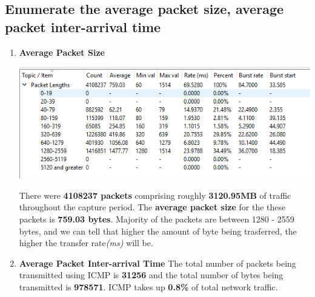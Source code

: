 \documentclass[a4paper,11pt]{article}
\begin{document}
\subsection{Enumerate the average packet size, average packet inter-arrival time }
\begin{enumerate}
	\item \textbf{Average Packet Size}
	\newline\newline
	\begin{minipage}{5in}
	\centering
		\includegraphics[width = 16cm]{avgpacketsize}
		\captionsetup{justification=centering}
	\end{minipage}
	\newline\newline
	There were \textbf{4108237 packets} comprising roughly \textbf{3120.95MB} of traffic throughout the capture period. The \textbf{average packet size} for the these packets is \textbf{759.03 bytes}. Majority of the packets are between 1280 - 2559 bytes, and we can tell that higher the amount of byte being trasferred, the higher the transfer rate\textit{(ms)} will be.
	\newline\newline
	\item \textbf{Average Packet Inter-arrival Time}
	\newline
	The total number of packets being transmitted using ICMP is \textbf{31256} and  the total number of bytes being transmitted is \textbf{978571}. 	
	ICMP takes up \textbf{0.8\%} of total network traffic.
\end{enumerate}
\end{document}
